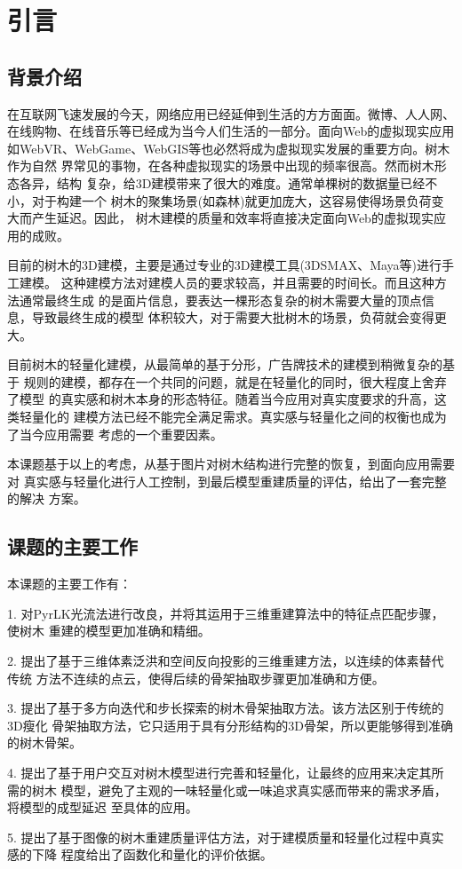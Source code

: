 



\chapter{引言}
\label{cha:intro}
\section{背景介绍}
\label{sec:background}
在互联网飞速发展的今天，网络应用已经延伸到生活的方方面面。微博、人人网、
在线购物、在线音乐等已经成为当今人们生活的一部分。面向Web的虚拟现实应用
如WebVR、WebGame、WebGIS等也必然将成为虚拟现实发展的重要方向。树木作为自然
界常见的事物，在各种虚拟现实的场景中出现的频率很高。然而树木形态各异，结构
复杂，给3D建模带来了很大的难度。通常单棵树的数据量已经不小，对于构建一个
树木的聚集场景(如森林)就更加庞大，这容易使得场景负荷变大而产生延迟。因此，
树木建模的质量和效率将直接决定面向Web的虚拟现实应用的成败。

目前的树木的3D建模，主要是通过专业的3D建模工具(3DSMAX、Maya等)进行手工建模。
这种建模方法对建模人员的要求较高，并且需要的时间长。而且这种方法通常最终生成
的是面片信息，要表达一棵形态复杂的树木需要大量的顶点信息，导致最终生成的模型
体积较大，对于需要大批树木的场景，负荷就会变得更大。

目前树木的轻量化建模，从最简单的基于分形，广告牌技术的建模到稍微复杂的基于
规则的建模，都存在一个共同的问题，就是在轻量化的同时，很大程度上舍弃了模型
的真实感和树木本身的形态特征。随着当今应用对真实度要求的升高，这类轻量化的
建模方法已经不能完全满足需求。真实感与轻量化之间的权衡也成为了当今应用需要
考虑的一个重要因素。

本课题基于以上的考虑，从基于图片对树木结构进行完整的恢复，到面向应用需要对
真实感与轻量化进行人工控制，到最后模型重建质量的评估，给出了一套完整的解决
方案。

\section{课题的主要工作}
\label{sec:objective}
本课题的主要工作有：

1. 对PyrLK光流法进行改良，并将其运用于三维重建算法中的特征点匹配步骤，使树木
重建的模型更加准确和精细。

2. 提出了基于三维体素泛洪和空间反向投影的三维重建方法，以连续的体素替代传统
方法不连续的点云，使得后续的骨架抽取步骤更加准确和方便。

3. 提出了基于多方向迭代和步长探索的树木骨架抽取方法。该方法区别于传统的3D瘦化
骨架抽取方法，它只适用于具有分形结构的3D骨架，所以更能够得到准确的树木骨架。

4. 提出了基于用户交互对树木模型进行完善和轻量化，让最终的应用来决定其所需的树木
模型，避免了主观的一味轻量化或一味追求真实感而带来的需求矛盾，将模型的成型延迟
至具体的应用。

5. 提出了基于图像的树木重建质量评估方法，对于建模质量和轻量化过程中真实感的下降
程度给出了函数化和量化的评价依据。
